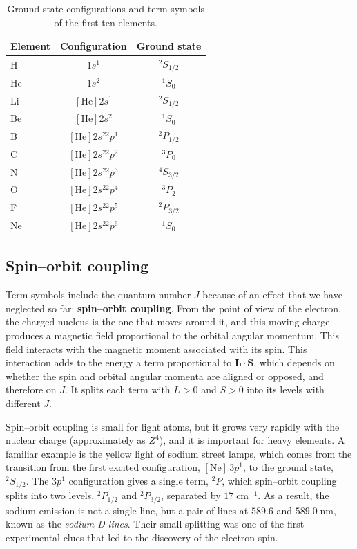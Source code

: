 \documentclass[
  english,
  9pt,
]{extbook}
\theoremstyle{definition}
\theoremstyle{definition}
\theoremstyle{definition}
\theoremstyle{definition}
\theoremstyle{remark}
\begin{document}
\begin{table}

\caption{\label{tab:tab3c9}Ground-state configurations and term symbols of the first ten elements.}
\centering
\begin{tabular}[t]{l|c|c}
\hline
Element & Configuration & Ground state\\
\hline
H & $1s^1$ & $^2S_{1/2}$\\
\hline
He & $1s^2$ & $^1S_0$\\
\hline
Li & $[\mathrm{He}]2s^1$ & $^2S_{1/2}$\\
\hline
Be & $[\mathrm{He}]2s^2$ & $^1S_0$\\
\hline
B & $[\mathrm{He}]2s^22p^1$ & $^2P_{1/2}$\\
\hline
C & $[\mathrm{He}]2s^22p^2$ & $^3P_0$\\
\hline
N & $[\mathrm{He}]2s^22p^3$ & $^4S_{3/2}$\\
\hline
O & $[\mathrm{He}]2s^22p^4$ & $^3P_2$\\
\hline
F & $[\mathrm{He}]2s^22p^5$ & $^2P_{3/2}$\\
\hline
Ne & $[\mathrm{He}]2s^22p^6$ & $^1S_0$\\
\hline
\end{tabular}
\end{table}

\subsection{Spin--orbit coupling}\label{spinorbit-coupling}

Term symbols include the quantum number \(J\) because of an effect that we have neglected so far: \textbf{spin--orbit coupling}. From the point of view of the electron, the charged nucleus is the one that moves around it, and this moving charge produces a magnetic field proportional to the orbital angular momentum. This field interacts with the magnetic moment associated with its spin. This interaction adds to the energy a term proportional to \(\mathbf{L}\cdot\mathbf{S}\), which depends on whether the spin and orbital angular momenta are aligned or opposed, and therefore on \(J\). It splits each term with \(L>0\) and \(S>0\) into its levels with different \(J\).

Spin--orbit coupling is small for light atoms, but it grows very rapidly with the nuclear charge (approximately as \(Z^4\)), and it is important for heavy elements. A familiar example is the yellow light of sodium street lamps, which comes from the transition from the first excited configuration, \([\mathrm{Ne}]\,3p^1\), to the ground state, \(^2S_{1/2}\). The \(3p^1\) configuration gives a single term, \(^2P\), which spin--orbit coupling splits into two levels, \(^2P_{1/2}\) and \(^2P_{3/2}\), separated by \(17\;\text{cm}^{-1}\). As a result, the sodium emission is not a single line, but a pair of lines at \(589.6\) and \(589.0\;\text{nm}\), known as the \emph{sodium D lines}. Their small splitting was one of the first experimental clues that led to the discovery of the electron spin.
\end{document}
